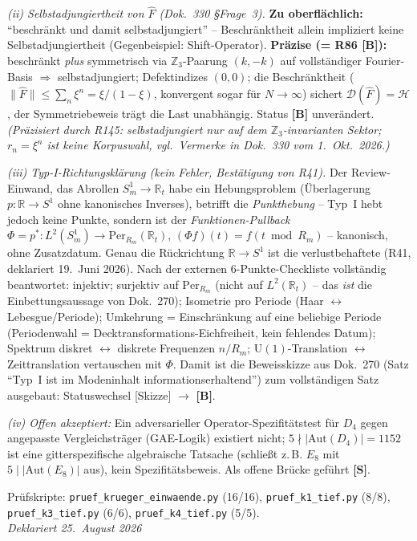 \emph{(ii) Selbstadjungiertheit von $\hat F$ (Dok.~330 §Frage~3).}
\textbf{Zu oberflächlich:} \enquote{beschränkt und damit selbstadjungiert}
-- Beschränktheit allein impliziert keine Selbstadjungiertheit
(Gegenbeispiel: Shift-Operator).
\textbf{Präzise (= R86 \textbf{[B]}):} beschränkt \emph{plus} symmetrisch
via $\mathbb{Z}_3$-Paarung $(k,-k)$ auf vollständiger Fourier-Basis
$\Rightarrow$ selbstadjungiert; Defektindizes $(0,0)$; die Beschränktheit
($\|\hat F\| \le \sum_n \xi^n = \xi/(1-\xi)$, konvergent sogar für
$N\to\infty$) sichert $\mathcal{D}(\hat F)=\mathcal{H}$, der
Symmetriebeweis trägt die Last unabhängig. Status \textbf{[B]} unverändert. \emph{(Präzisiert durch R145: selbstadjungiert nur auf dem $\mathbb{Z}_3$-invarianten Sektor; $r_n=\xi^n$ ist keine Korpuswahl, vgl.\ Vermerke in Dok.~330 vom 1.~Okt.~2026.)}

\emph{(iii) Typ-I-Richtungsklärung (kein Fehler, Bestätigung von R41).}
Der Review-Einwand, das Abrollen $S^1_m \to \mathbb{R}_t$ habe ein
Hebungsproblem (Überlagerung $p:\mathbb{R}\to S^1$ ohne kanonisches
Inverses), betrifft die \emph{Punkthebung} -- Typ~I hebt jedoch keine
Punkte, sondern ist der \emph{Funktionen-Pullback}
$\Phi = p^*: L^2(S^1_m) \to \mathrm{Per}_{R_m}(\mathbb{R}_t)$,
$(\Phi f)(t) = f(t \bmod R_m)$ -- kanonisch, ohne Zusatzdatum.
Genau die Rückrichtung $\mathbb{R}\to S^1$ ist die verlustbehaftete
(R41, deklariert 19.~Juni 2026). Nach der externen 6-Punkte-Checkliste
vollständig beantwortet: injektiv; surjektiv auf
$\mathrm{Per}_{R_m}$ (nicht auf $L^2(\mathbb{R}_t)$ -- das \emph{ist}
die Einbettungsaussage von Dok.~270); Isometrie pro Periode
(Haar $\leftrightarrow$ Lebesgue/Periode); Umkehrung = Einschränkung
auf eine beliebige Periode (Periodenwahl = Decktransformations-Eichfreiheit,
kein fehlendes Datum); Spektrum diskret $\leftrightarrow$ diskrete
Frequenzen $n/R_m$; $\mathrm{U}(1)$-Translation $\leftrightarrow$
Zeittranslation vertauschen mit $\Phi$.
Damit ist die Beweisskizze aus Dok.~270 (Satz \enquote{Typ~I ist im
Modeninhalt informationserhaltend}) zum vollständigen Satz ausgebaut:
Statuswechsel [Skizze] $\to$ \textbf{[B]}.

\emph{(iv) Offen akzeptiert:} Ein adversarieller Operator-Spezifitätstest
für $D_4$ gegen angepasste Vergleichsträger (GAE-Logik) existiert nicht;
$5 \nmid |\mathrm{Aut}(D_4)| = 1152$ ist eine gitterspezifische
algebraische Tatsache (schließt z.\,B. $E_8$ mit $5 \mid |\mathrm{Aut}(E_8)|$
aus), kein Spezifitätsbeweis. Als offene Brücke geführt \textbf{[S]}.

Prüfskripte: \texttt{pruef\_krueger\_einwaende.py} (16/16),
\texttt{pruef\_k1\_tief.py} (8/8), \texttt{pruef\_k3\_tief.py} (6/6),
\texttt{pruef\_k4\_tief.py} (5/5).\\
\emph{Deklariert 25.~August 2026}

